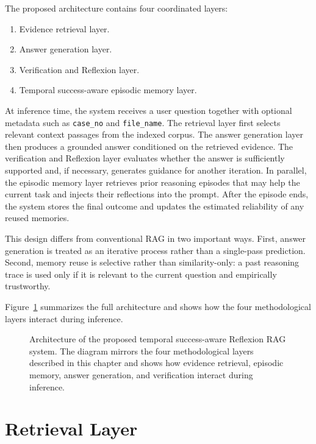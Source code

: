 The proposed architecture contains four coordinated layers:

\begin{enumerate}[leftmargin=*]
\item Evidence retrieval layer.
\item Answer generation layer.
\item Verification and Reflexion layer.
\item Temporal success-aware episodic memory layer.
\end{enumerate}

At inference time, the system receives a user question together with optional metadata such as \texttt{case\_no} and \texttt{file\_name}. The retrieval layer first selects relevant context passages from the indexed corpus. The answer generation layer then produces a grounded answer conditioned on the retrieved evidence. The verification and Reflexion layer evaluates whether the answer is sufficiently supported and, if necessary, generates guidance for another iteration. In parallel, the episodic memory layer retrieves prior reasoning episodes that may help the current task and injects their reflections into the prompt. After the episode ends, the system stores the final outcome and updates the estimated reliability of any reused memories.

This design differs from conventional RAG in two important ways. First, answer generation is treated as an iterative process rather than a single-pass prediction. Second, memory reuse is selective rather than similarity-only: a past reasoning trace is used only if it is relevant to the current question and empirically trustworthy.

Figure~\ref{fig:methodology-architecture} summarizes the full architecture and shows how the four methodological layers interact during inference.

\begin{figure}[H]
    \centering
    
    \caption{Architecture of the proposed temporal success-aware Reflexion RAG system. The diagram mirrors the four methodological layers described in this chapter and shows how evidence retrieval, episodic memory, answer generation, and verification interact during inference.}
    \label{fig:methodology-architecture}
\end{figure}

\section{Retrieval Layer}
\label{sec:methodology-retrieval}

